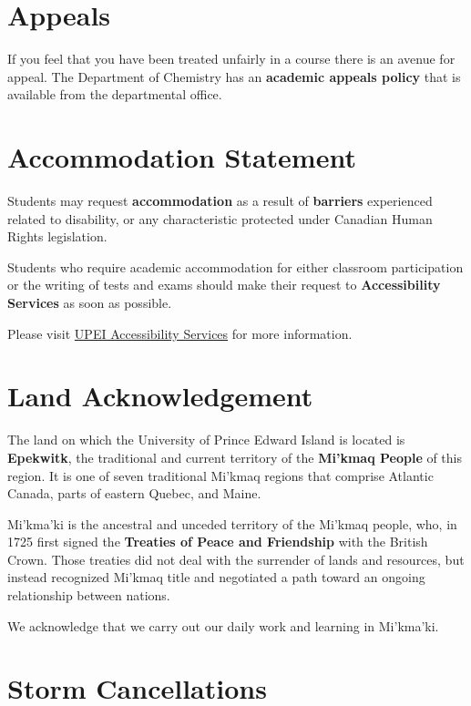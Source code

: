 \section{Appeals}

If you feel that you have been treated unfairly in a course there is an avenue for appeal. The Department of Chemistry has an \textbf{academic appeals policy} that is available from the departmental office.

\section{Accommodation Statement}

Students may request \textbf{accommodation} as a result of \textbf{barriers} experienced related to disability, or any characteristic protected under Canadian Human Rights legislation.

Students who require academic accommodation for either classroom participation or the writing of tests and exams should make their request to \textbf{Accessibility Services} as soon as possible.

Please visit \href{https://upei.ca/accessibility}{UPEI Accessibility Services} for more information.

\section{Land Acknowledgement}

The land on which the University of Prince Edward Island is located is \textbf{Epekwitk}, the traditional and current territory of the \textbf{Mi'kmaq People} of this region. It is one of seven traditional Mi'kmaq regions that comprise Atlantic Canada, parts of eastern Quebec, and Maine.

Mi'kma'ki is the ancestral and unceded territory of the Mi'kmaq people, who, in 1725 first signed the \textbf{Treaties of Peace and Friendship} with the British Crown. Those treaties did not deal with the surrender of lands and resources, but instead recognized Mi'kmaq title and negotiated a path toward an ongoing relationship between nations.

We acknowledge that we carry out our daily work and learning in Mi'kma'ki.

\section{Storm Cancellations}

